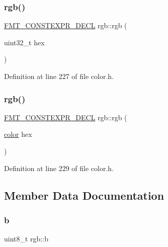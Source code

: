 \subsubsection{\texorpdfstring{rgb()}{rgb()}\hspace{0.1cm}{\footnotesize\ttfamily [3/4]}}
{\footnotesize\ttfamily \hyperlink{core_8h_af4388801466a5994a363d6005616371a}{F\+M\+T\+\_\+\+C\+O\+N\+S\+T\+E\+X\+P\+R\+\_\+\+D\+E\+CL} rgb\+::rgb (\begin{DoxyParamCaption}\item[{uint32\+\_\+t}]{hex }\end{DoxyParamCaption})\hspace{0.3cm}{\ttfamily [inline]}}



Definition at line 227 of file color.\+h.

\mbox{\label{structrgb_afca0dec9f937cc454d31aa4a724fbf48}} 
\subsubsection{\texorpdfstring{rgb()}{rgb()}\hspace{0.1cm}{\footnotesize\ttfamily [4/4]}}
{\footnotesize\ttfamily \hyperlink{core_8h_af4388801466a5994a363d6005616371a}{F\+M\+T\+\_\+\+C\+O\+N\+S\+T\+E\+X\+P\+R\+\_\+\+D\+E\+CL} rgb\+::rgb (\begin{DoxyParamCaption}\item[{\hyperlink{color_8h_a80d1dc5f416b97f92939a4166d41203c}{color}}]{hex }\end{DoxyParamCaption})\hspace{0.3cm}{\ttfamily [inline]}}



Definition at line 229 of file color.\+h.



\subsection{Member Data Documentation}
\mbox{\label{structrgb_a5ff4e0f515919a82c3f401afa8555da4}} 
\subsubsection{\texorpdfstring{b}{b}}
{\footnotesize\ttfamily uint8\+\_\+t rgb\+::b}



